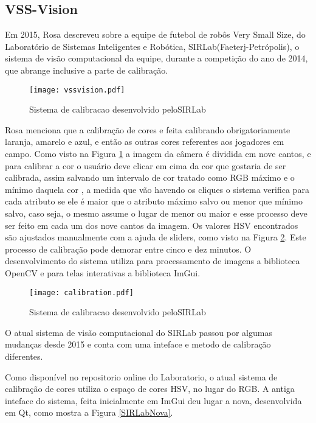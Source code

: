 \subsection{VSS-Vision}

Em 2015, Rosa\cite{Rosa:2015} descreveu sobre a equipe de futebol de rob\^os Very Small Size, do Laboratório de Sistemas Inteligentes e Robótica, SIRLab(Faeterj-Petrópolis), o sistema de visão computacional da equipe, durante a competição do ano de 2014, que abrange inclusive a parte de calibração. 

\begin{figure}[H]
	\centering
	\texttt{[image: vssvision.pdf]} 	
	\caption{Sistema de calibracao desenvolvido peloSIRLab \cite{Rosa:2015}}
	\label{SIRLabCalibracao}
\end{figure}
Rosa menciona que a calibração de cores e feita calibrando obrigatoriamente laranja, amarelo e azul, e então as outras cores referentes aos jogadores em campo. Como visto na Figura \ref{SIRLabCalibracao} a imagem da c\^amera é dividida em nove cantos, e para calibrar a cor o usuário deve clicar em cima da cor que gostaria de ser calibrada, assim salvando um intervalo de cor tratado como RGB máximo e o mínimo daquela cor , a medida
que vão havendo os cliques o sistema verifica para cada atributo se ele é maior que o atributo
máximo salvo ou menor que mínimo salvo, caso seja, o mesmo assume o lugar de menor ou
maior\cite{Rosa:2015} e esse processo deve ser feito em cada um dos nove cantos da imagem. Os valores HSV encontrados s\~ao ajustados manualmente com a ajuda de sliders, como visto na Figura \ref{SIRLabCalibracaoHSV}. Este processo de calibração pode demorar entre cinco e dez minutos.
O desenvolvimento do sistema utiliza para processamento de imagens a biblioteca OpenCV e para telas interativas a biblioteca  ImGui.

\begin{figure}[!h]
	\centering
	\texttt{[image: calibration.pdf]} 	
	\caption{Sistema de calibracao desenvolvido peloSIRLab \cite{VSSVision}}
	\label{SIRLabCalibracaoHSV}
\end{figure}

O atual sistema de visão computacional do SIRLab passou por algumas mudanças desde 2015 e conta com uma inteface e metodo de calibração diferentes\cite{VSSVision}. 

Como disponível no repositorio online do Laboratorio, o atual sistema de calibração de cores utiliza o espaço de cores HSV, no lugar do RGB\cite{Rosa:2015}. A antiga inteface do sistema, feita inicialmente em ImGui deu lugar a nova, desenvolvida em Qt, como mostra a Figura \ref{SIRLabNova}.

